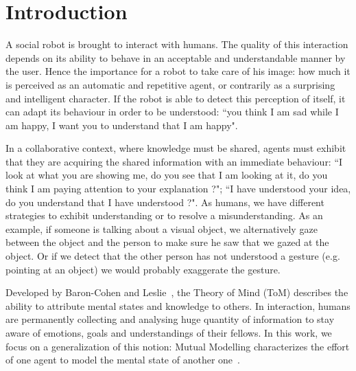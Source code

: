 \documentclass[conference]{IEEEtran}
\begin{document}
\section{Introduction}
%
%
%
%
%
%
%
%


A social robot is brought to interact with humans. The quality of this interaction depends on its ability to behave in an acceptable and understandable manner by the user. Hence the importance for a robot to take care of his image: how much it is perceived as an automatic and repetitive agent, or contrarily as a surprising and intelligent character. If the robot is able to detect this perception of itself, it can adapt its behaviour in order to be understood: ``you think I am sad while I am happy, I want you to understand that I am happy". 

In a collaborative context, where knowledge must be shared, agents must exhibit that they are acquiring the shared information with an immediate behaviour: ``I look at what you are showing me, do you see that I am looking at it, do you think I am paying attention to your explanation ?"; ``I have understood your idea, do you understand that I have understood ?". 
As humans, we have different strategies to exhibit understanding or to resolve a misunderstanding. 
As an example, if someone is talking about a visual object, we alternatively gaze between the object and the person to make sure he saw that we gazed at the object. Or if we detect that the other person has not understood a gesture (e.g. pointing at an object) we would probably exaggerate the gesture.

Developed by Baron-Cohen and Leslie~\cite{baron1985does}, the Theory of Mind (ToM) describes the ability to attribute mental states and knowledge to others. In interaction, humans are permanently collecting and analysing huge quantity of information to stay aware of emotions, goals and understandings of their fellows. In this work, we focus on a generalization of this notion: Mutual Modelling characterizes the effort of one agent to model the mental state of another one~\cite{dillenbourg1999you}. 
\end{document}
